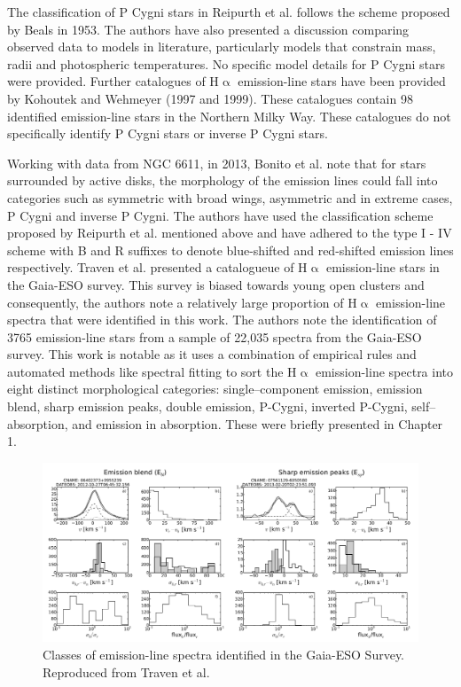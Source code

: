 The classification of P Cygni stars in Reipurth et al. follows the scheme proposed by Beals in 1953\cite{1953PDAO....9....1B}. The authors have also presented a discussion comparing observed data to models in literature, particularly models that constrain mass, radii and photospheric temperatures. No specific model details for P Cygni stars were provided. Further catalogues of H$\upalpha$ emission-line stars have been provided by Kohoutek and Wehmeyer (1997 and 1999). These catalogues contain 98 identified emission-line stars in the Northern Milky Way. These catalogues do not specifically identify P Cygni stars or inverse P Cygni stars\cite{kohoutek1999catalogue}.

Working with data from NGC 6611, in 2013, Bonito et al.\cite{bonito2013spectroscopic} note that for stars surrounded by active disks, the morphology of the emission lines could fall into categories such as symmetric with broad wings, asymmetric and in extreme cases, P Cygni and inverse P Cygni. The authors have used the classification scheme proposed by Reipurth et al. mentioned above and have adhered to the type I - IV scheme with B and R suffixes to denote blue-shifted and red-shifted emission lines respectively. 
Traven et al. presented a catalogueue of H$\upalpha$ emission-line stars in the Gaia-ESO survey. This survey is biased towards young open clusters and consequently, the authors note a relatively large proportion of H$\upalpha$ emission-line spectra that were identified in this work. The authors note the identification of 3765 emission-line stars from a sample of 22,035 spectra from the Gaia-ESO survey. This work is notable as it uses a combination of empirical rules and automated methods like spectral fitting to sort the H$\upalpha$ emission-line spectra into eight distinct morphological categories: single–component emission, emission blend, sharp emission peaks, double emission, P-Cygni, inverted P-Cygni, self–absorption, and emission in absorption\cite{traven2015gaia}. These were briefly presented in Chapter 1.

\begin{figure}[!htb]
\centering
\includegraphics[scale=.50]{figures/gaia eso1.png}
\caption{Classes of emission-line spectra identified in the Gaia-ESO Survey. Reproduced from Traven et al.}
\end{figure}

